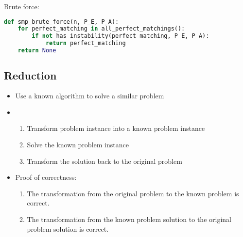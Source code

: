 Brute force:

\begin{lstlisting}[language=Python]
def smp_brute_force(n, P_E, P_A):
    for perfect_matching in all_perfect_matchings():
        if not has_instability(perfect_matching, P_E, P_A):
            return perfect_matching
    return None
\end{lstlisting}

\subsection{Reduction}

\begin{itemize}
    \item Use a known algorithm to solve a similar problem
    \item \begin{enumerate}
              \item Transform problem instance into a known problem instance
              \item Solve the known problem instance
              \item Transform the solution back to the original problem
          \end{enumerate}
    \item Proof of correctness: \begin{enumerate}
              \item The transformation from the original problem to the known problem is correct.
              \item The transformation from the known problem solution to the original problem solution is correct.
          \end{enumerate}
\end{itemize}
